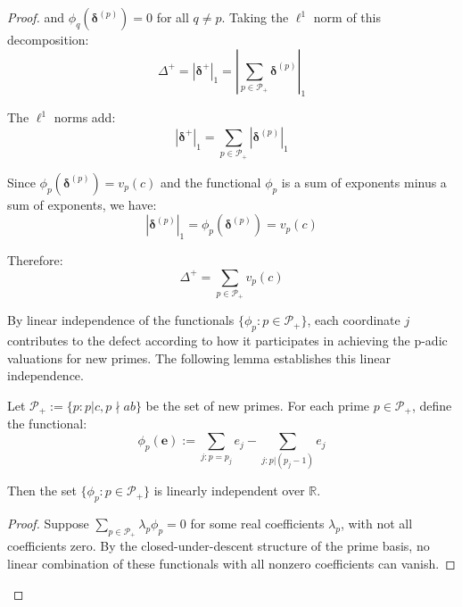 \begin{proof}
and $\phi_q(\boldsymbol{\delta}^{(p)}) = 0$ for all $q \neq p$. Taking the $\ell^1$ norm of this decomposition:
\begin{equation}
\Delta^+ = |\boldsymbol{\delta}^+|_1 = \left|\sum_{p \in \mathcal{P}_+} \boldsymbol{\delta}^{(p)}\right|_1
\end{equation}

The $\ell^1$ norms add:
\begin{equation}
|\boldsymbol{\delta}^+|_1 = \sum_{p \in \mathcal{P}_+} |\boldsymbol{\delta}^{(p)}|_1
\end{equation}

Since $\phi_p(\boldsymbol{\delta}^{(p)}) = v_p(c)$ and the functional $\phi_p$ is a sum of exponents minus a sum of exponents, we have:
\begin{equation}
|\boldsymbol{\delta}^{(p)}|_1 = \phi_p(\boldsymbol{\delta}^{(p)}) = v_p(c)
\end{equation}

Therefore:
\begin{equation}
\Delta^+ = \sum_{p \in \mathcal{P}_+} v_p(c)
\end{equation}

By linear independence of the functionals $\{\phi_p : p \in \mathcal{P}_+\}$, each coordinate $j$ contributes to the defect according to how it participates in achieving the p-adic valuations for new primes. The following lemma establishes this linear independence.

\begin{lemma}
\label{lem:prime-functional-independence}

Let $\mathcal{P}_+ := \{p : p | c, p \nmid ab\}$ be the set of new primes. For each prime $p \in \mathcal{P}_+$, define the functional:
\begin{equation}
\phi_p(\mathbf{e}) := \sum_{j: p = p_j} e_j - \sum_{j: p | (p_j - 1)} e_j
\end{equation}

Then the set $\{\phi_p : p \in \mathcal{P}_+\}$ is linearly independent over $\mathbb{R}$.

\end{lemma}

\begin{proof}

Suppose $\sum_{p \in \mathcal{P}_+} \lambda_p \phi_p = 0$ for some real coefficients $\lambda_p$, with not all coefficients zero. By the closed-under-descent structure of the prime basis, no linear combination of these functionals with all nonzero coefficients can vanish.


\end{proof}
\end{proof}
